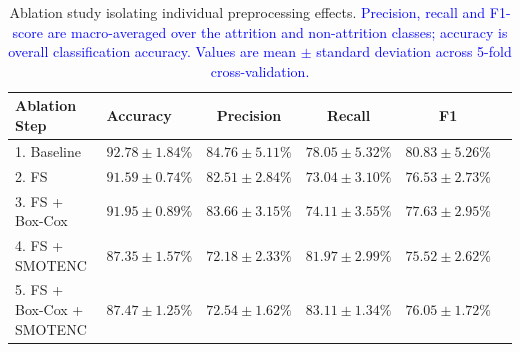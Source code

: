 \documentclass[a4paper,fleqn]{cas-sc}
\begin{document}
\begin{table}[pos=h]
\centering
    \caption{Ablation study isolating individual preprocessing effects. \textcolor{blue}{Precision, recall and F1-score are macro-averaged over the attrition and non-attrition classes; accuracy is overall classification accuracy. Values are mean $\pm$ standard deviation across 5-fold cross-validation.}}
\label{tab:ablation_study}
\begin{tabular}{l l c c c c}
\hline
\textbf{Ablation Step} & \textbf{Accuracy} & \textbf{Precision} & \textbf{Recall} & \textbf{F1} \\
\hline
1. Baseline & $92.78 \pm 1.84\%$ & $84.76 \pm 5.11\%$ & $78.05 \pm 5.32\%$ & $80.83 \pm 5.26\%$ \\
2. FS & $91.59 \pm 0.74\%$ & $82.51 \pm 2.84\%$ & $73.04 \pm 3.10\%$ & $76.53 \pm 2.73\%$ \\
3. FS + Box-Cox & $91.95 \pm 0.89\%$ & $83.66 \pm 3.15\%$ & $74.11 \pm 3.55\%$ & $77.63 \pm 2.95\%$ \\
4. FS + SMOTENC & $87.35 \pm 1.57\%$ & $72.18 \pm 2.33\%$ & $81.97 \pm 2.99\%$ & $75.52 \pm 2.62\%$ \\
5. FS + Box-Cox + SMOTENC & $87.47 \pm 1.25\%$ & $72.54 \pm 1.62\%$ & $83.11 \pm 1.34\%$ & $76.05 \pm 1.72\%$ \\
\hline
\end{tabular}
\end{table}
\end{document}
